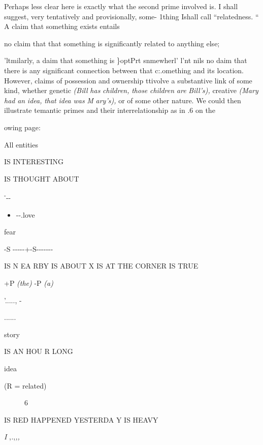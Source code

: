 Perhaps less clear here is exactly what the second prime in\-volved is. I shall suggest, very tentatively and provisionally, some- 1thing Ishall call ``relatedness. `` A claim that something exists entails

no claim that that something is significantly related to anything else;

'ltmilarly, a daim that something is \}optPrt snmewherl' l'nt nils no daim that there is any significant connection between that c:.ome\-thing and its location. However, claims of possession and ownership ttivolve a substantive link of some kind, whether genetic \textit{(Bill} \textit{has} \textit{children,} \textit{those} \textit{children} \textit{are} \textit{Bill's),} creative \textit{(Mary} \textit{had} \textit{an} \textit{idea,} \textit{that} \textit{idea} \textit{was} \textit{M} \textit{ary's),} or of some other nature. We could then illustrate temantic primes and their interrelationship as in .6 on the

owing page:



All entities 

IS INTERESTING

IS THOUGHT ABOUT

\textsuperscript{{}-}{}-{}- 

\begin{itemize}
\item {}-{}-.love
\end{itemize}

fear

{}-S {}-{}-{}-{}-{}-+{}-S{}-{}-{}-{}-{}-{}-{}-

IS N EA RBY IS ABOUT X IS AT THE CORNER IS TRUE 

+P \textit{(th}\textit{e}\textit{) }{}-P \textit{(}\textit{a}\textit{)} 

'....., -

......

story

IS AN HOU R LONG 

idea

(R = related)

\begin{figure}
\caption{6}
\label{fig:4}
\end{figure}

IS RED HAPPENED YESTERDA Y IS HEAVY

\textit{I },\textit{.},\textit{,,}

